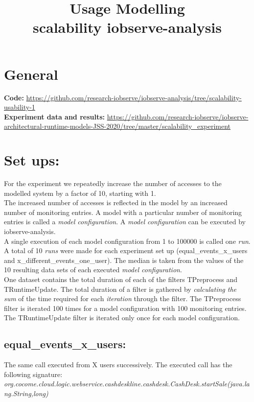 \documentclass[10pt,a4paper]{article}
\begin{document}
	\title{Usage Modelling\\scalability iobserve-analysis}
	\date{}
	\maketitle
	
	\section{General}
	\textbf{Code:} \url{https://github.com/research-iobserve/iobserve-analysis/tree/scalability-usability-1}\\
	\textbf{Experiment data and results:} \url{https://github.com/research-iobserve/iobserve-architectural-runtime-models-JSS-2020/tree/master/scalability_experiment}
	
	\section{Set ups:}
	For the experiment we repeatedly increase the number of accesses to the modelled system by a factor of 10, starting with 1.\\
	The increased number of accesses is reflected in the model by an increased number of monitoring entries.
	A model with a particular number of monitoring entries is called a \emph{model configuration}.
	A \emph{model configuration} can be executed by iobserve-analysis.\\
	A single execution of each model configuration from 1 to 100000 is called one \emph{run}.
	A total of 10 \emph{runs} were made for each experiment set up (equal\_events\_x\_users and x\_different\_events\_one\_user). 
	The median is taken from the values of the 10 resulting data sets of each executed \emph{model configuration}.\\
	One dataset contains the total duration of each of the filters TPreprocess and TRuntimeUpdate. 
	The total duration of a filter is gathered by \emph{calculating the sum} of the time required for each \emph{iteration} through the filter.
	The TPreprocess filter is iterated 100 times for a model configuration with 100 monitoring entries.
	The TRuntimeUpdate filter is iterated only once for each model configuration.
	
	\subsection{equal\_events\_x\_users:}
	The same call executed from X users successively. The executed call has the following signature:\\ \emph{org.cocome.cloud.logic.webservice.cashdeskline.cashdesk.CashDesk.startSale(java.lang.String,long)}
	
\end{document}
